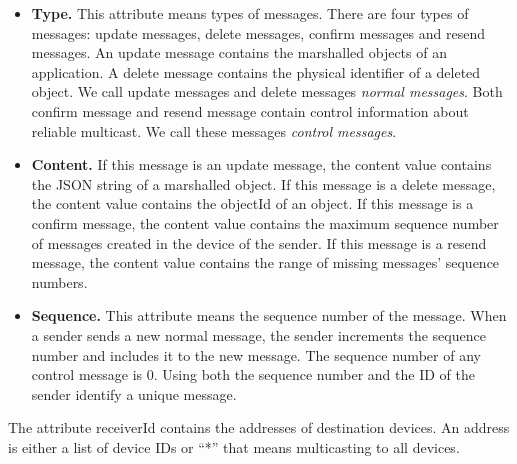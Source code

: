 \documentclass[twocolumn,10pt]{article}
\begin{document}
\begin{itemize}
	\setlength{\itemsep}{1pt}
	\setlength{\parskip}{0pt}
	\setlength{\parsep}{0pt}
	\item \textbf{Type.}
	This attribute means types of messages.
	There are four types of messages: update messages, delete messages, confirm messages and resend messages.
	An update message contains the marshalled objects of an application.
	A delete message contains the physical identifier of a deleted object.
	We call update messages and delete messages \emph{normal messages}. 
	Both confirm message and resend message contain control information about reliable multicast. 
	We call these messages \emph{control messages}.
	\item \textbf{Content.} 
	If this message is an update message, the content value contains the JSON string of a marshalled object.
	If this message is a delete message, the content value contains the objectId of an object.
	If this message is a confirm message, the content value contains the maximum sequence number of messages created in the device of the sender.
	If this message is a resend message, the content value contains the range of missing messages' sequence numbers.
	\item \textbf{Sequence.}
	This attribute means the sequence number of the message.
	When a sender sends a new normal message, the sender increments the sequence number and includes it to the new message.
	The sequence number of any control message is 0.
	Using both the sequence number and the ID of the sender identify a unique message.
\end{itemize}

The attribute receiverId contains the addresses of destination devices.
An address is either a list of device IDs or ``*'' that means multicasting to all devices.
\end{document}
